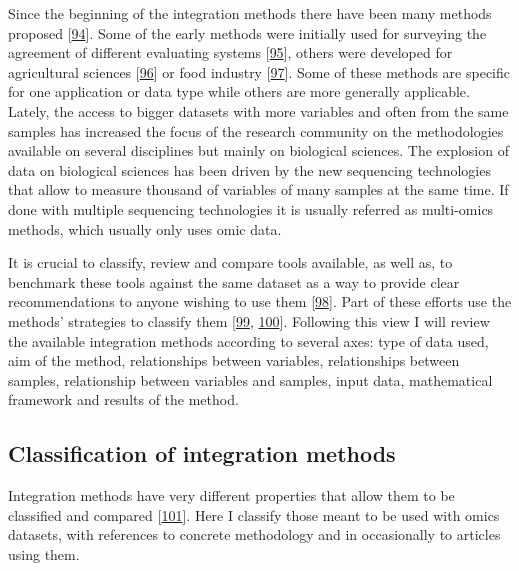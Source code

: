 \documentclass[
  a4paper,
]{book}
\begin{document}
Since the beginning of the integration methods there have been many methods proposed {[}\protect\hyperlink{ref-krassowski2020}{94}{]}.
Some of the early methods were initially used for surveying the agreement of different evaluating systems {[}\protect\hyperlink{ref-yannakoudakis2015}{95}{]}, others were developed for agricultural sciences {[}\protect\hyperlink{ref-hotelling_relations_1936}{96}{]} or food industry {[}\protect\hyperlink{ref-biancolillo}{97}{]}.
Some of these methods are specific for one application or data type while others are more generally applicable.
Lately, the access to bigger datasets with more variables and often from the same samples has increased the focus of the research community on the methodologies available on several disciplines but mainly on biological sciences.
The explosion of data on biological sciences has been driven by the new sequencing technologies that allow to measure thousand of variables of many samples at the same time.
If done with multiple sequencing technologies it is usually referred as multi-omics methods, which usually only uses omic data.

It is crucial to classify, review and compare tools available, as well as, to benchmark these tools against the same dataset as a way to provide clear recommendations to anyone wishing to use them {[}\protect\hyperlink{ref-wu_selective_2019}{98}{]}. Part of these efforts use the methods' strategies to classify them {[}\protect\hyperlink{ref-cavill2016}{99}, \protect\hyperlink{ref-chongComputationalApproachesIntegrative2017}{100}{]}.
Following this view I will review the available integration methods according to several axes: type of data used, aim of the method, relationships between variables, relationships between samples, relationship between variables and samples, input data, mathematical framework and results of the method.

\hypertarget{classification-of-integration-methods}{%
\subsection{Classification of integration methods}\label{classification-of-integration-methods}}

Integration methods have very different properties that allow them to be classified and compared {[}\protect\hyperlink{ref-huang2017}{101}{]}.
Here I classify those meant to be used with omics datasets, with references to concrete methodology and in occasionally to articles using them.
\end{document}
